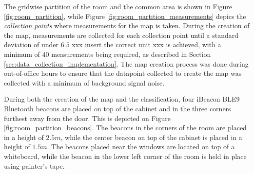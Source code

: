 The gridwise partition of the room and the common area is shown in Figure \ref{fig:room_partition}, while Figure \ref{fig:room_partition_measurements} depics the \textit{collection points} where measurements for the map is taken.
During the creation of the map, measurements are collected for each collection point until a standard deviation of under $6.5$ xxx insert the correct unit xxx is achieved, with a minimum of $40$ measurements being required, as described in Section \ref{sec:data_collection_implementation}.
The map creation process was done during out-of-office hours to ensure that the datapoint collected to create the map was collected with a minimum of background signal noise.

During both the creation of the map and the classification, four iBeacon BLE9 Bluetooth beacons \cite{BluetoothiBeaconBLE9} are placed on top of the cabinet and in the three corners furthest away from the door. This is depicted on Figure \ref{fig:room_partition_beacons}.
The beacons in the corners of the room are placed in a height of $2.5m$, while the center beacon on top of the cabinet is placed in a height of $1.5m$.
The beacons placed near the windows are located on top of a whiteboard, while the beacon in the lower left corner of the room is held in place using painter's tape.





